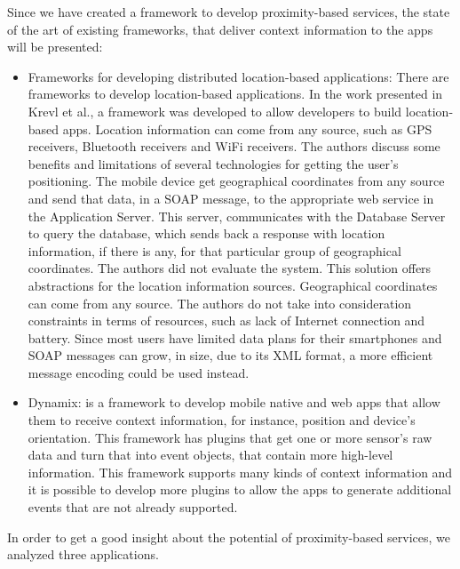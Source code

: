 Since we have created a framework to develop
proximity-based services, the state
of the art of existing frameworks, that deliver
context information to the apps will be presented:
\begin{itemize}
  \item Frameworks for developing distributed
  location-based applications:
  There are frameworks to develop location-based
  applications.
  In the work presented in Krevl et al.\cite{Krevl2006},
  a framework
  was developed to allow developers to build
  location-based apps. Location information can come
  from any source, such as \gls{GPS} receivers, Bluetooth
  receivers and \gls{WiFi} receivers.
  The authors discuss some benefits and limitations
  of several technologies for getting the
  user's positioning.
  The mobile device get geographical coordinates
  from any source and send that data, in a
  \gls{SOAP}\cite{Seely:2001:SCP:560836} message,
  to the appropriate web service in the Application
  Server. This server, communicates with the Database Server
  to query the database, which sends back a response with
  location information, if there is any, for that
  particular group of geographical coordinates.
  The authors did not evaluate the system.
  This solution offers abstractions for the location
  information sources. Geographical coordinates can
  come from any source.
  The authors do not take into consideration
  constraints in terms of resources, such as
  lack of Internet connection and battery.
  Since most users have limited data plans for
  their smartphones and \gls{SOAP} messages can
  grow, in size, due to its \gls{XML} format,
  a more efficient message encoding could be used
  instead.
  \item Dynamix\cite{Carlson2012}:
  is a framework to develop
  mobile native and web apps that allow them to receive
  context information, for instance, position and device's
  orientation. This framework has plugins that get
  one or more sensor's raw data and turn that into event
  objects, that contain more high-level information.
  This framework supports many kinds of context information
  and it is possible to develop more plugins to allow the
  apps to generate additional events that are not
  already supported.
\end{itemize}

In order to get a good insight about the potential of proximity-based services, we analyzed three applications.

